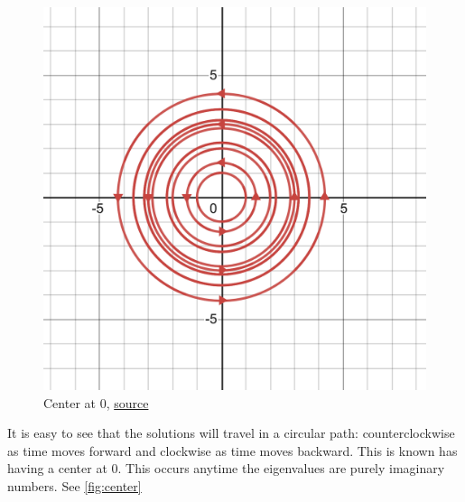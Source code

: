 \begin{figure}[ht]
    \centering
    \includegraphics[scale=0.4]{Images/center.png}
    \caption{Center at 0, \href{https://www.desmos.com/calculator/votqebxxgy}{source}}
    \label{fig:center}
\end{figure}

It is easy to see that the solutions will travel in a circular path: counterclockwise as time moves forward and clockwise as time moves backward. This is known has having a center at 0. This occurs anytime the eigenvalues are purely imaginary numbers. See \autoref{fig:center}\\

